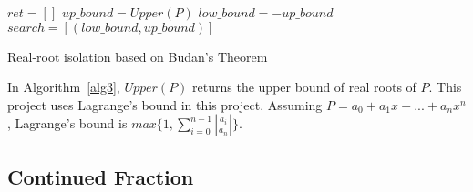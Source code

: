 \begin{algorithm}[H]
\label{alg3}
\SetAlgoLined


  $ret = []$\;
  $up\_bound = Upper(P)$\;
  $low\_bound = - up\_bound$\;
  $search = [(low\_bound, up\_bound)]$\;


  \;
\caption{Real-root isolation based on Budan's Theorem}
\end{algorithm}






In Algorithm~\ref{alg3}, $Upper(P)$ returns the upper bound of real roots of
$P$. This project uses Lagrange's bound\cite{Lag} in this project. Assuming $P =
a_0 + a_1x + ... + a_nx^n$, Lagrange's bound is $max\{1,
\sum_{i=0}^{n-1}|\frac{a_i}{a_n}|\}$.





\subsection{Continued Fraction}

